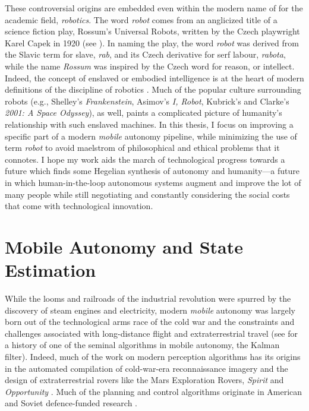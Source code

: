 These controversial origins are embedded even within the modern name of for the academic field, \textit{robotics}. The word \textit{robot} comes from an anglicized title of a science fiction play, Rossum's Universal Robots, written by the Czech playwright Karel Capek in 1920 (see ). In naming the play, the word \textit{robot} was derived from the Slavic term for slave, \textit{rab}, and its Czech derivative for serf labour, \textit{rabota}, while the name \textit{Rossum} was inspired by the Czech word for reason, or intellect. Indeed, the concept of enslaved or embodied  intelligence is at the heart of modern definitions of the discipline of robotics \citep{Redfield2019-pi}. Much of the popular culture surrounding robots (e.g., Shelley's \textit{Frankenstein}, Asimov's \textit{I, Robot}, Kubrick's and Clarke's \textit{2001: A Space Odyssey}), as well, paints a complicated picture of humanity's relationship with such enslaved machines. In this thesis, I focus on improving a specific part of a modern \textit{mobile} autonomy pipeline, while minimizing the use of term \textit{robot} to avoid maelstrom of philosophical and ethical problems that it connotes. I hope my work aids the march of technological progress towards a future which finds some Hegelian synthesis of autonomy and humanity---a future in which human-in-the-loop autonomous systems augment and improve the lot of many people while still negotiating and constantly considering the social costs that come with technological innovation.

\section{Mobile Autonomy and State Estimation}
While the looms and railroads of the industrial revolution were spurred by the discovery of steam engines and electricity, modern \textit{mobile} autonomy was largely born out of the technological arms race of the cold war and the constraints and challenges associated with long-distance flight and extraterrestrial travel (see \cite{Grewal2010-ts} for a history of one of the seminal algorithms in mobile autonomy, the Kalman filter). Indeed, much of the work on modern perception algorithms has its origins in the automated compilation of cold-war-era reconnaissance imagery and the design of extraterrestrial rovers like the Mars Exploration Rovers, \textit{Spirit} and \textit{Opportunity} \citep{Scaramuzza2011-qr}. Much of the planning and control algorithms originate in American and Soviet defence-funded research \citep{Nilsson1984-oc,Thrun2006-hb}.

